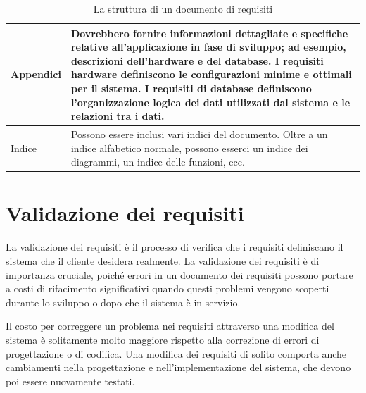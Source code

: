 \begin{table}[ht]
\begin{tabular}{|p{4cm}|p{11cm}|}
Appendici & Dovrebbero fornire informazioni dettagliate e specifiche relative all'applicazione in fase di sviluppo; ad esempio, descrizioni dell'hardware e del database. I requisiti hardware definiscono le configurazioni minime e ottimali per il sistema. I requisiti di database definiscono l'organizzazione logica dei dati utilizzati dal sistema e le relazioni tra i dati.\\\hline
Indice & Possono essere inclusi vari indici del documento. Oltre a un indice alfabetico normale, possono esserci un indice dei diagrammi, un indice delle funzioni, ecc.
\\\hline
\end{tabular}
\caption{La struttura di un documento di requisiti}
\label{tab:structure-requirements-document}
\end{table}

\section{Validazione dei requisiti}
La validazione dei requisiti è il processo di verifica che i requisiti definiscano il sistema che il cliente desidera realmente. La validazione dei requisiti è di importanza cruciale, poiché errori in un documento dei requisiti possono portare a costi di rifacimento significativi quando questi problemi vengono scoperti durante lo sviluppo o dopo che il sistema è in servizio.

Il costo per correggere un problema nei requisiti attraverso una modifica del sistema è solitamente molto maggiore rispetto alla correzione di errori di progettazione o di codifica. Una modifica dei requisiti di solito comporta anche cambiamenti nella progettazione e nell’implementazione del sistema, che devono poi essere nuovamente testati.

